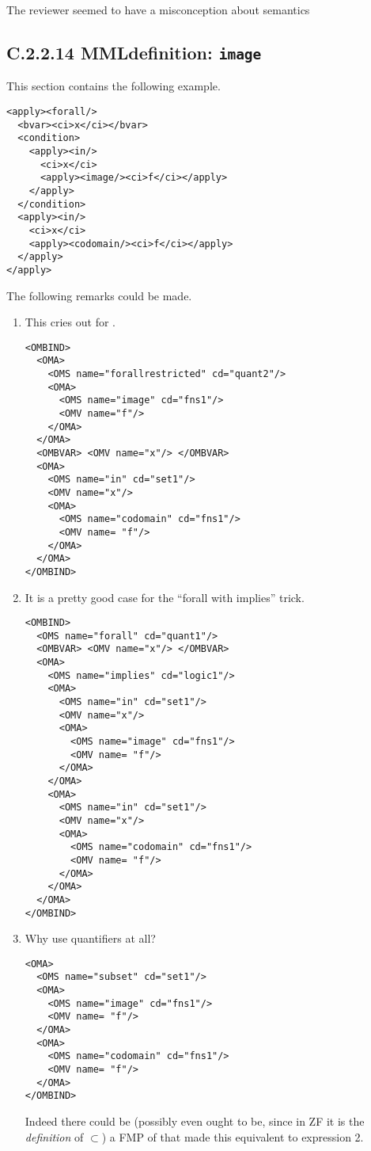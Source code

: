 \documentclass{llncs}
\begin{document}
\begin{newpart}{The reviewer seemed to have a misconception about semantics}
\subsection{C.2.2.14 MMLdefinition: {\tt image}\label{C2214}}
This section contains the following example.
\begin{lstlisting}[language=MathML2]
<apply><forall/>
  <bvar><ci>x</ci></bvar>
  <condition>
    <apply><in/>
      <ci>x</ci>
      <apply><image/><ci>f</ci></apply>
    </apply>
  </condition>
  <apply><in/>
    <ci>x</ci>
    <apply><codomain/><ci>f</ci></apply>
  </apply>
</apply>
\end{lstlisting}
The following remarks could be made.
\begin{enumerate}
\item This cries out for {}.
\begin{lstlisting}
<OMBIND>
  <OMA>
    <OMS name="forallrestricted" cd="quant2"/>
    <OMA>
      <OMS name="image" cd="fns1"/>
      <OMV name="f"/>
    </OMA>
  </OMA>
  <OMBVAR> <OMV name="x"/> </OMBVAR>
  <OMA>
    <OMS name="in" cd="set1"/>
    <OMV name="x"/> 
    <OMA>
      <OMS name="codomain" cd="fns1"/>
      <OMV name= "f"/>
    </OMA>
  </OMA>
</OMBIND>
\end{lstlisting}
\item It is a pretty good case for the ``forall with implies'' trick.
\begin{lstlisting}
<OMBIND>
  <OMS name="forall" cd="quant1"/>
  <OMBVAR> <OMV name="x"/> </OMBVAR>
  <OMA>
    <OMS name="implies" cd="logic1"/>
    <OMA>
      <OMS name="in" cd="set1"/>
      <OMV name="x"/> 
      <OMA>
        <OMS name="image" cd="fns1"/>
        <OMV name= "f"/>
      </OMA>
    </OMA>
    <OMA>
      <OMS name="in" cd="set1"/>
      <OMV name="x"/> 
      <OMA>
        <OMS name="codomain" cd="fns1"/>
        <OMV name= "f"/>
      </OMA>
    </OMA>
  </OMA>
</OMBIND>
\end{lstlisting}
\item Why use quantifiers at all?
\begin{lstlisting}
<OMA>
  <OMS name="subset" cd="set1"/>
  <OMA>
    <OMS name="image" cd="fns1"/>
    <OMV name= "f"/>
  </OMA>
  <OMA>
    <OMS name="codomain" cd="fns1"/>
    <OMV name= "f"/>
  </OMA>
</OMBIND>
\end{lstlisting}
Indeed there could be (possibly even ought to be, since in ZF it is the
{\emph{definition}} of $\subset$) a FMP of {} that made this
equivalent to expression 2.
\end{enumerate}

\end{newpart}
\end{document}
